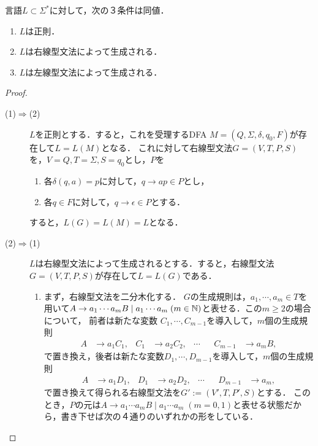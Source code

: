 \documentclass[uplatex, dvipdfmx]{jsreport}
\begin{document}
\begin{theorem}[正則言語の特徴付け]\label{thm-characterization-of-regular-language-as-CFL}
    言語$L\subset\Sigma^*$に対して，次の３条件は同値．
    \begin{enumerate}
        \item $L$は正則．
        \item $L$は右線型文法によって生成される．
        \item $L$は左線型文法によって生成される．
    \end{enumerate}
\end{theorem}
\begin{proof}\mbox{}
    \begin{description}
        \item[(1)$\Rightarrow$(2)] 
        $L$を正則とする．すると，これを受理するDFA $M=(Q,\Sigma,\delta,q_0,F)$が存在して$L=L(M)$となる．
        これに対して右線型文法$G=(V,T,P,S)$を，$V=Q,T=\Sigma,S=q_0$とし，$P$を
        \begin{enumerate}
            \item 各$\delta(q,a)=p$に対して，$q\to ap\in P$とし，
            \item 各$q\in F$に対して，$q\to\epsilon\in P$とする．
        \end{enumerate}
        すると，$L(G)=L(M)=L$となる．
        \item[(2)$\Rightarrow$(1)] 
        $L$は右線型文法によって生成されるとする．すると，右線型文法$G=(V,T,P,S)$が存在して$L=L(G)$である．
        \begin{enumerate}
            \item まず，右線型文法を二分木化する．
            $G$の生成規則は，$a_1,\cdots,a_m\in T$を用いて$A\to a_1\cdots a_mB\mid a_1\cdots a_m\;(m\in\mathbb{N})$と表せる．この$m\ge 2$の場合について，
            前者は新たな変数
            $C_1,\cdots,C_{m-1}$を導入して，$m$個の生成規則
            \begin{align*}
                A&\to a_1C_1,&C_1&\to a_2C_2,&\cdots&&C_{m-1}&\to a_mB,
            \end{align*}
            で置き換え，後者は新たな変数$D_1,\cdots,D_{m-1}$を導入して，$m$個の生成規則
            \begin{align*}
                A&\to a_1D_1,&D_1&\to a_2D_2,&\cdots&&D_{m-1}&\to a_m,
            \end{align*}
            で置き換えて得られる右線型文法を$G':=(V',T,P',S)$とする．
            このとき，$P$の元は$A\to a_1\cdots a_mB\mid a_1\cdots a_m\;(m=0,1)$と表せる状態だから，書き下せば次の４通りのいずれかの形をしている．

\end{enumerate}
\end{description}
\end{proof}
\end{document}
